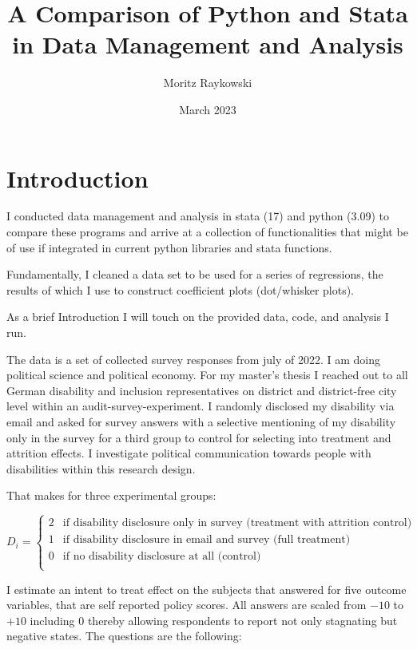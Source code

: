 \documentclass[10pt]{article}
\title{A Comparison of Python and Stata in Data Management and Analysis
}
\author{Moritz Raykowski}
\date{March 2023}
\begin{document}
\section{Introduction}
I conducted data management and analysis in stata (17) and python (3.09) to compare these programs 
and arrive at a collection of functionalities that might be of use if integrated in current python 
libraries and stata functions.

Fundamentally, I cleaned a data set to be used for a series of regressions, the results of which I use to construct coefficient plots 
(dot/whisker plots).

As a brief Introduction I will touch on the provided data, code, and analysis I run.

The data is a set of collected survey responses from july of 2022. I am doing political science and political economy.
For my master's thesis I reached out to all German disability and inclusion representatives on district and district-free city 
level within an audit-survey-experiment. I randomly disclosed my disability via email and asked for survey answers with a selective mentioning of my disability 
only in the survey for a third group to control for selecting into treatment and attrition effects.
I investigate political communication towards people with disabilities within this research design.

That makes for three experimental groups:

\begin{equation}
    D_{i} = \begin{cases}
          2 & \text{if disability disclosure only in survey (treatment with attrition control)}\\
          1 & \text{if disability disclosure in email and survey (full treatment)}\\
          0 & \text{if no disability disclosure at all (control)}\\
        \end{cases} 
    \end{equation}

I estimate an intent to treat effect on the subjects that answered for five outcome variables, that are 
self reported policy scores. 
All answers are scaled from $-10$ to $+10$ including $0$ thereby allowing respondents to report 
not only stagnating but negative states. The questions are the following:
\end{document}

